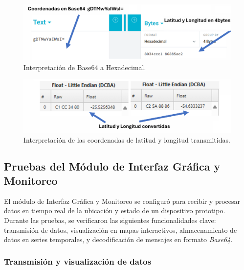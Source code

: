 \begin{figure}[H]
\leavevmode
\begin{minipage}{\textwidth}
\begin{center}
\includegraphics[width=\textwidth]{./capitulo_05/imagen/base64a.png}
\caption{Interpretación de Base64 a Hexadecimal.\label{fig:base64a}}
\end{center}
\end{minipage}
\end{figure}

\begin{figure}[H]
\leavevmode
\begin{minipage}{\textwidth}
\begin{center}
\includegraphics[width=\textwidth]{./capitulo_05/imagen/base64b.png}
\caption{Interpretación de las coordenadas de latitud y longitud transmitidas.\label{fig:base64b}}
\end{center}
\end{minipage}
\end{figure}

\subsection{Pruebas del Módulo de Interfaz Gráfica y Monitoreo}
El módulo de Interfaz Gráfica y Monitoreo se configuró para recibir y procesar datos en tiempo real de la ubicación y estado de un dispositivo prototipo. Durante las pruebas, se verificaron las siguientes funcionalidades clave: transmisión de datos, visualización en mapas interactivos, almacenamiento de datos en series temporales, y decodificación de mensajes en formato \textit{Base64}.

\subsubsection{Transmisión y visualización de datos}

